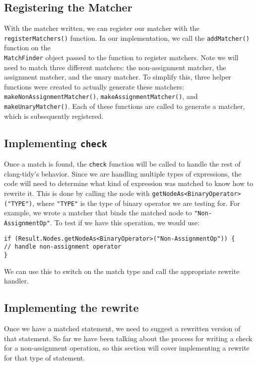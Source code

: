 \subsection{Registering the Matcher}

With the matcher written, we can register our matcher with the \texttt{registerMatchers()} function. In our implementation, we call the \texttt{addMatcher()} function on the\\ \texttt{MatchFinder} object passed to the function to register matchers. Note we will need to match three different matchers: the non-assignment matcher, the assignment matcher, and the unary matcher. To simplify this, three helper functions were created to actually generate these matchers: \texttt{makeNonAssignmentMatcher()}, \texttt{makeAssignmentMatcher()}, and \texttt{makeUnaryMatcher()}. Each of these functions are called to generate a matcher, which is subsequently registered.

\subsection{Implementing \texttt{check}}
Once a match is found, the \texttt{check} function will be called to handle the rest of clang-tidy's behavior. Since we are handling multiple types of expressions, the code will need to determine what kind of expression was matched to know how to rewrite it. This is done by calling the node with \texttt{getNodeAs<BinaryOperator>("TYPE")}, where \texttt{"TYPE"} is the type of binary operator we are testing for. For example, we wrote a matcher that binds the matched node to \texttt{"Non-AssignmentOp"}. To test if we have this operation, we would use:
\begin{center}
\parbox{0.9\linewidth}{
\texttt{if (Result.Nodes.getNodeAs<BinaryOperator>("Non-AssignmentOp")) \{\\
\hspace*{2em}// handle non-assignment operator\\
\}}
}
\end{center}

We can use this to switch on the match type and call the appropriate rewrite handler.

\subsection{Implementing the rewrite}

Once we have a matched statement, we need to suggest a rewritten version of that statement. So far we have been talking about the process for writing a check for a non-assignment operation, so this section will cover implementing a rewrite for that type of statement.

